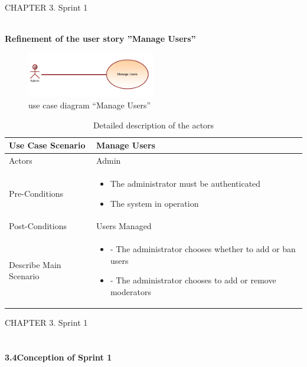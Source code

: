 \documentclass{article}
\begin{document}
{{{{{{{\newpage
\noindent
CHAPTER 3.  Sprint 1 \\
\underline{\hspace{\textwidth}} \vspace{0.2cm}\\
{\large \textbf{Refinement of the user story ”Manage Users”}
\begin{figure}[htbp]
    \centering
    \includegraphics[width=0.5\textwidth]{muse}
    \caption{use case diagram “Manage Users”}
    \label{fig:design2}
\end{figure}
\begin{table}[h]
    \centering
    \begin{tabularx}{\textwidth}{X|X}
        \toprule
        Use Case Scenario & Manage Users \\
        \midrule
        Actors & Admin \\
        \midrule
        Pre-Conditions & \begin{itemize}[label=$\bullet$]
\item The administrator must be authenticated 
\item The system in operation
 \end{itemize} \\
        \midrule
	 Post-Conditions & Users Managed  \\
        \midrule
        Describe Main Scenario &  \begin{itemize}[label=$\bullet$]
            \item - The administrator chooses whether to add or ban users
            \item- The administrator chooses to add or remove moderators
    
        \end{itemize} \\
        \bottomrule
    \end{tabularx}
    \caption{Detailed description of the actors}
    \label{tab:actors_roles}
\end{table}



\newpage
\noindent
CHAPTER 3.  Sprint 1 \\
\underline{\hspace{\textwidth}} \vspace{0.2cm}\\
\\{\Large \textbf{3.4\hspace{1em}Conception of Sprint 1}}\vspace{0.2cm}

}}}}}}}}
\end{document}
